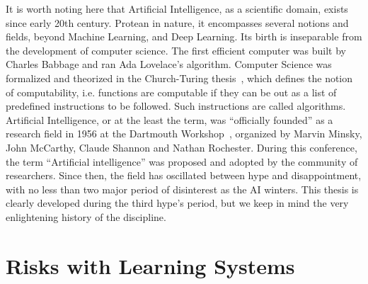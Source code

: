 It is worth noting here that Artificial Intelligence, as a scientific domain, exists since early 20th century. Protean in nature, it encompasses several notions and fields, beyond Machine Learning, and Deep Learning.  Its birth is inseparable from the development of computer science. The first efficient computer was built by Charles Babbage and ran Ada Lovelace's algorithm.  Computer Science was formalized and theorized in the Church-Turing thesis~\citep{turing1950computing}, which defines the notion of computability, i.e. functions are computable if they can be out as a list of predefined instructions to be followed. Such instructions are called algorithms. Artificial Intelligence, or at the least the term,  was  ``officially founded'' as a research field in 1956 at the Dartmouth Workshop~\citep{mccarthy2006proposal}, organized by Marvin Minsky, John McCarthy, Claude Shannon and Nathan Rochester. During this conference, the term ``Artificial intelligence'' was proposed and adopted by the community of researchers. Since then, the field has oscillated between hype and disappointment, with no less than two major period of disinterest  as the AI winters. This thesis is clearly developed during the third hype's period, but we keep in mind the very enlightening  history of the discipline.  




\section{Risks with Learning Systems}





